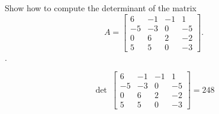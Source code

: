 
\begin{exerciseStatement}


Show how to compute the determinant of the matrix \[A= \left[\begin{array}{cccc}
6 & -1 & -1 & 1 \\
-5 & -3 & 0 & -5 \\
0 & 6 & 2 & -2 \\
5 & 5 & 0 & -3
\end{array}\right] .\].


\end{exerciseStatement}
    
\begin{exerciseAnswer} 
\[\operatorname{det}\  \left[\begin{array}{cccc}
6 & -1 & -1 & 1 \\
-5 & -3 & 0 & -5 \\
0 & 6 & 2 & -2 \\
5 & 5 & 0 & -3
\end{array}\right] = 248 \]
\end{exerciseAnswer}
    

